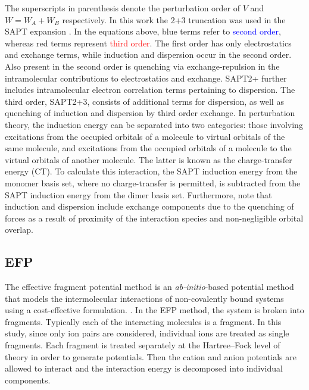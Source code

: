 The superscripts in parenthesis denote the perturbation order of $V$ and $W = W_A + W_B$ respectively. 
In this work the 2+3 truncation was used in the SAPT expansion
\cite{Turney2012a}.
In the equations above, blue terms refer to \textcolor{blue}{second order}, whereas red terms represent \textcolor{red}{third order}.
The first order has only electrostatics and exchange terms, while induction and dispersion occur in the second order.
Also present in the second order is quenching via exchange-repulsion in the intramolecular contributions to electrostatics and exchange.
SAPT2+ further includes intramolecular electron correlation terms pertaining to dispersion.
The third order, SAPT2+3, consists of additional terms for dispersion, as well as quenching of induction and dispersion by third order exchange.
In perturbation theory, the induction energy can be separated into two categories: those involving excitations from the occupied orbitals of a molecule to virtual orbitals of the same molecule, and excitations from the occupied orbitals of a molecule to the virtual orbitals of another molecule.
\cite{Stone2009a}
The latter is known as the charge-transfer energy (CT).
To calculate this interaction, the SAPT induction energy from the monomer basis set, where no charge-transfer is permitted, is subtracted from the SAPT induction energy from the dimer basis set.
Furthermore, note that induction and dispersion include exchange components due to the quenching of forces as a result of proximity of the interaction species and non-negligible orbital overlap.
\cite{Jeziorski1994a, Hohenstein2010a, Hohenstein2010b, Hohenstein2010c, Hohenstein2011a, Hohenstein2012a}



\subsection{EFP}
The effective fragment potential method is an \emph{ab-initio}-based potential method that models the intermolecular interactions of non-covalently bound systems using a cost-effective formulation.
\cite{Gordon2001a, Gordon2007a, Gordon2009a, Mullin2009a, Ghosh2010a}.
In the EFP method, the system is broken into fragments.
Typically each of the interacting molecules is a fragment. 
In this study, since only ion pairs are considered, individual ions are treated as single fragments. 
Each fragment is treated separately at the Hartree--Fock level of theory in order to generate potentials.
Then the cation and anion potentials are allowed to interact and the interaction energy is decomposed into individual components.


